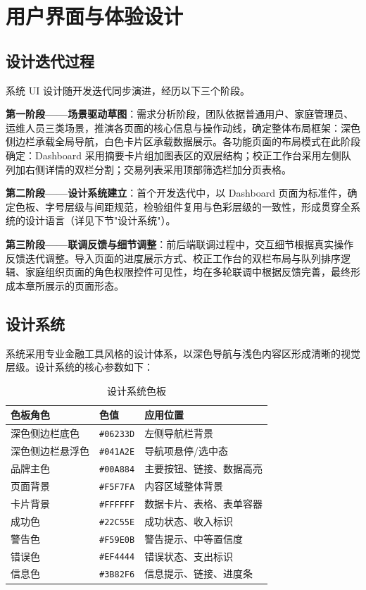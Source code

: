 \chapter{用户界面与体验设计}

\section{设计迭代过程}

系统 UI 设计随开发迭代同步演进，经历以下三个阶段。

\textbf{第一阶段——场景驱动草图}：需求分析阶段，团队依据普通用户、家庭管理员、运维人员三类场景，推演各页面的核心信息与操作动线，确定整体布局框架：深色侧边栏承载全局导航，白色卡片区承载数据展示。各功能页面的布局模式在此阶段确定：Dashboard 采用摘要卡片组加图表区的双层结构；校正工作台采用左侧队列加右侧详情的双栏分割；交易列表采用顶部筛选栏加分页表格。

\textbf{第二阶段——设计系统建立}：首个开发迭代中，以 Dashboard 页面为标准件，确定色板、字号层级与间距规范，检验组件复用与色彩层级的一致性，形成贯穿全系统的设计语言（详见下节"设计系统"）。

\textbf{第三阶段——联调反馈与细节调整}：前后端联调过程中，交互细节根据真实操作反馈迭代调整。导入页面的进度展示方式、校正工作台的双栏布局与队列排序逻辑、家庭组织页面的角色权限控件可见性，均在多轮联调中根据反馈完善，最终形成本章所展示的页面形态。

\section{设计系统}

系统采用专业金融工具风格的设计体系，以深色导航与浅色内容区形成清晰的视觉层级。设计系统的核心参数如下：

\begin{table}[H]
\centering
\caption{设计系统色板}
\label{tab:design-system}
\begin{tabular}{p{3.5cm} p{3.5cm} p{3.5cm}}
\toprule
\textbf{色板角色} & \textbf{色值} & \textbf{应用位置} \\
\midrule
深色侧边栏底色 & \texttt{\#06233D} & 左侧导航栏背景 \\
\hline
深色侧边栏悬浮色 & \texttt{\#041A2E} & 导航项悬停/选中态 \\
\hline
品牌主色 & \texttt{\#00A884} & 主要按钮、链接、数据高亮 \\
\hline
页面背景 & \texttt{\#F5F7FA} & 内容区域整体背景 \\
\hline
卡片背景 & \texttt{\#FFFFFF} & 数据卡片、表格、表单容器 \\
\hline
成功色 & \texttt{\#22C55E} & 成功状态、收入标识 \\
\hline
警告色 & \texttt{\#F59E0B} & 警告提示、中等置信度 \\
\hline
错误色 & \texttt{\#EF4444} & 错误状态、支出标识 \\
\hline
信息色 & \texttt{\#3B82F6} & 信息提示、链接、进度条 \\
\bottomrule
\end{tabular}
\end{table}


